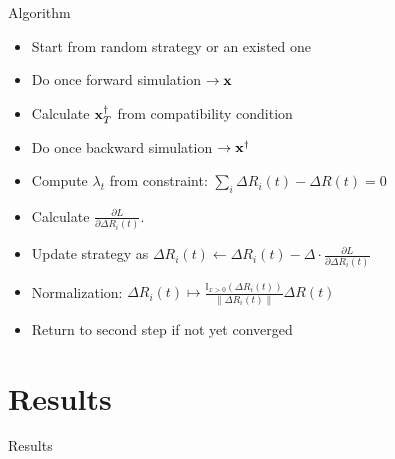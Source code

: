 \documentclass{beamer}
\newcommand{\pa}{\partial}
\newcommand{\xx}{{\bf x}}
\newcommand{\xd}{{\bf x}^{\dagger}}
\begin{document}
\begin{frame}{Algorithm}
	\begin{itemize}
		\item Start from random strategy or an existed one
		\item Do {\color{red}once forward simulation} $\rightarrow \xx$
		\item Calculate $\xd_T$ from compatibility condition
		\item Do {\color{red}once backward simulation} $\rightarrow \xd$
		\item Compute $\lambda_t$ from constraint: $\sum_{i}\Delta R_i(t) - \Delta R(t) = 0$
		\item Calculate $\frac{\pa L}{\pa \Delta R_i(t)}$.
		\item Update strategy as $\Delta R_i(t) \leftarrow \Delta R_i(t) - \Delta\cdot\frac{\pa L}{\pa \Delta R_i(t)}$
		\item Normalization: $\Delta R_i(t) \longmapsto \frac {\mathbb{I}_{x>0}(\Delta R_i(t))} {\|\Delta R_i(t)\|} \Delta R(t)$
		\item Return to second step if not yet converged
		
	\end{itemize}
\end{frame}


\section{Results}
\begin{frame}
\begin{center}
	\Huge Results
\end{center}
\end{frame}

\end{document}
